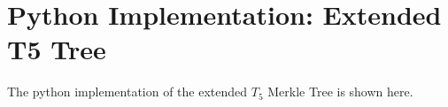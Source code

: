 \chapter{Python Implementation: Extended T5 Tree}
\label{cha:appendix_t5_tree_implementation}
The python implementation of the extended $T_5$ Merkle Tree is shown here.




